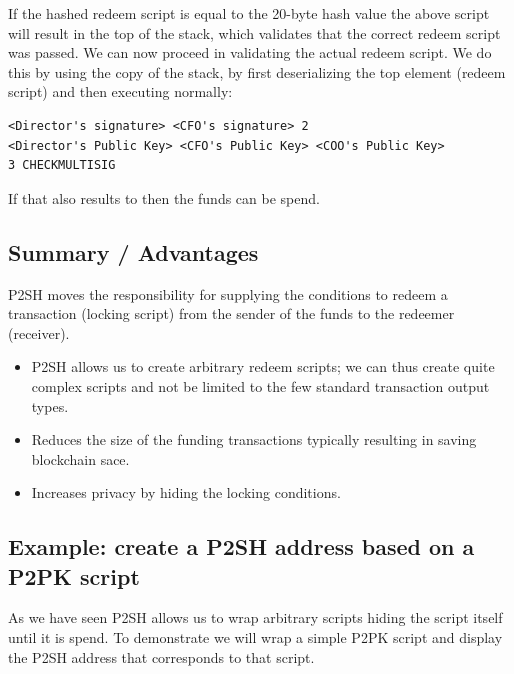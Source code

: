If the hashed redeem script is equal to the 20-byte hash value the above script will result  in the top of the stack, which validates that the correct redeem script was passed. We can now proceed in validating the actual redeem script. We do this by using the copy of the stack, by first deserializing the top element (redeem script) and then executing normally:

\begin{emphbox}
\begin{lstlisting}[style=Pseudomath]
<Director's signature> <CFO's signature> 2
<Director's Public Key> <CFO's Public Key> <COO's Public Key>
3 CHECKMULTISIG
\end{lstlisting}
\end{emphbox}

If that also results to  then the funds can be spend.

\subsection*{Summary / Advantages}
P2SH moves the responsibility for supplying the conditions to redeem a transaction (locking script) from the sender of the funds to the redeemer (receiver).

\begin{itemize}
\item P2SH allows us to create arbitrary redeem scripts; we can thus create quite complex scripts and not be limited to the few standard transaction output types.
\item Reduces the size of the funding transactions typically resulting in saving blockchain sace.
\item Increases privacy by hiding the locking conditions.
\end{itemize}

\subsection*{Example: create a P2SH address based on a P2PK script}
As we have seen P2SH allows us to wrap arbitrary scripts hiding the script itself until it is spend. To demonstrate we will wrap a simple P2PK script and display the P2SH address that corresponds to that script.


